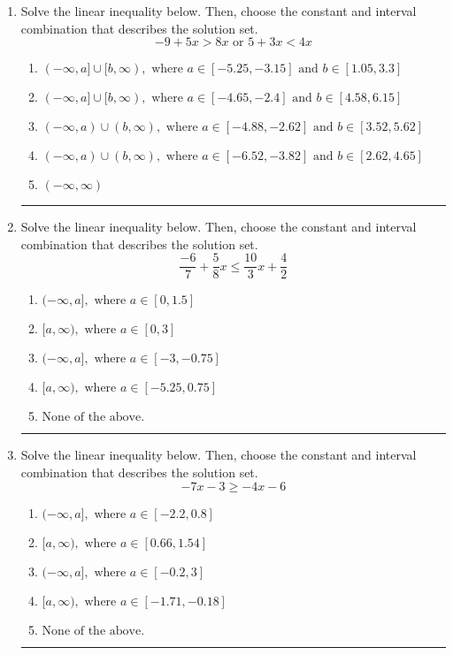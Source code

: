 \documentclass[14pt]{extbook}
\newcommand{\litem}[1]{\item#1\hspace*{-1cm}\rule{\textwidth}{0.4pt}}
\begin{document}
\begin{enumerate}
{\begin{enumerate}[label=\Alph*.]
\end{enumerate} }
\litem{
Solve the linear inequality below. Then, choose the constant and interval combination that describes the solution set.\[ -9 + 5 x > 8 x \text{ or } 5 + 3 x < 4 x \]\begin{enumerate}[label=\Alph*.]
\item \( (-\infty, a] \cup [b, \infty), \text{ where } a \in [-5.25, -3.15] \text{ and } b \in [1.05, 3.3] \)
\item \( (-\infty, a] \cup [b, \infty), \text{ where } a \in [-4.65, -2.4] \text{ and } b \in [4.58, 6.15] \)
\item \( (-\infty, a) \cup (b, \infty), \text{ where } a \in [-4.88, -2.62] \text{ and } b \in [3.52, 5.62] \)
\item \( (-\infty, a) \cup (b, \infty), \text{ where } a \in [-6.52, -3.82] \text{ and } b \in [2.62, 4.65] \)
\item \( (-\infty, \infty) \)

\end{enumerate} }
\litem{
Solve the linear inequality below. Then, choose the constant and interval combination that describes the solution set.\[ \frac{-6}{7} + \frac{5}{8} x \leq \frac{10}{3} x + \frac{4}{2} \]\begin{enumerate}[label=\Alph*.]
\item \( (-\infty, a], \text{ where } a \in [0, 1.5] \)
\item \( [a, \infty), \text{ where } a \in [0, 3] \)
\item \( (-\infty, a], \text{ where } a \in [-3, -0.75] \)
\item \( [a, \infty), \text{ where } a \in [-5.25, 0.75] \)
\item \( \text{None of the above}. \)

\end{enumerate} }
\litem{
Solve the linear inequality below. Then, choose the constant and interval combination that describes the solution set.\[ -7x -3 \geq -4x -6 \]\begin{enumerate}[label=\Alph*.]
\item \( (-\infty, a], \text{ where } a \in [-2.2, 0.8] \)
\item \( [a, \infty), \text{ where } a \in [0.66, 1.54] \)
\item \( (-\infty, a], \text{ where } a \in [-0.2, 3] \)
\item \( [a, \infty), \text{ where } a \in [-1.71, -0.18] \)
\item \( \text{None of the above}. \)


\end{enumerate}}
\end{enumerate}
\end{document}
